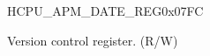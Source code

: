\begin{register}{H}{CPU\_APM\_DATE\_REG}{0x07FC}\label{regdesc:CPUAPMDATEREG}
%
%
\regnewline%
\begin{regdesc}\begin{reglist}
\label{fielddesc:CPUAPMDATE}\item [CPU\_APM\_DATE] Version control register. (R/W)
\end{reglist}\end{regdesc}
\end{register}


